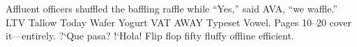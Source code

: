 \documentclass{article}
\begin{document}
Affluent officers shuffled the baffling raffle while ``Yes,'' said AVA, ``we
waffle.'' LTV Tallow Today Wafer Yogurt VAT AWAY Typeset Vowel. Pages 10--20
cover it---entirely. ?`Que pasa? !`Hola! Flip flop fifty fluffy
offline efficient.
\end{document}
